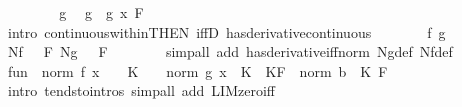\begin{isabellebody}
\ \ \isamarkupfalse%
\isanewline
\ \ \ \ \isamarkupfalse%
\ g\ \isamarkupfalse%
\ {\isachardoublequoteopen}{\isacharparenleft}{\kern0pt}g\ {\isasymlonglongrightarrow}\ g\ x{\isacharparenright}{\kern0pt}\ {\isacharquery}{\kern0pt}F{\isachardoublequoteclose}\isanewline
\ \ \ \ \ \ \isamarkupfalse%
\ {\isacharparenleft}{\kern0pt}intro\ continuous{\isacharunderscore}{\kern0pt}within{\isacharbrackleft}{\kern0pt}THEN\ iffD{}{\isacharbrackright}{\kern0pt}\ has{\isacharunderscore}{\kern0pt}derivative{\isacharunderscore}{\kern0pt}continuous{\isacharparenright}{\kern0pt}\isanewline
\ \ \ \ \isamarkupfalse%
\ \isamarkupfalse%
\ f\ g\ \isamarkupfalse%
\ {\isachardoublequoteopen}{\isacharparenleft}{\kern0pt}Nf\ {\isasymlonglongrightarrow}\ {}{\isacharparenright}{\kern0pt}\ {\isacharquery}{\kern0pt}F{\isachardoublequoteclose}\ {\isachardoublequoteopen}{\isacharparenleft}{\kern0pt}Ng\ {\isasymlonglongrightarrow}\ {}{\isacharparenright}{\kern0pt}\ {\isacharquery}{\kern0pt}F{\isachardoublequoteclose}\isanewline
\ \ \ \ \ \ \isamarkupfalse%
\ {\isacharparenleft}{\kern0pt}simp{\isacharunderscore}{\kern0pt}all\ add{\isacharcolon}{\kern0pt}\ has{\isacharunderscore}{\kern0pt}derivative{\isacharunderscore}{\kern0pt}iff{\isacharunderscore}{\kern0pt}norm\ Ng{\isacharunderscore}{\kern0pt}def\ Nf{\isacharunderscore}{\kern0pt}def{\isacharparenright}{\kern0pt}\isanewline
\ \ \ \ \isamarkupfalse%
\ \isamarkupfalse%
\ {\isachardoublequoteopen}{\isacharparenleft}{\kern0pt}{\isacharquery}{\kern0pt}fun{}\ {\isasymlonglongrightarrow}\ norm\ {\isacharparenleft}{\kern0pt}f\ x{\isacharparenright}{\kern0pt}\ {\isacharasterisk}{\kern0pt}\ {}\ {\isacharasterisk}{\kern0pt}\ K\ {\isacharplus}{\kern0pt}\ {}\ {\isacharasterisk}{\kern0pt}\ norm\ {\isacharparenleft}{\kern0pt}g\ x{\isacharparenright}{\kern0pt}\ {\isacharasterisk}{\kern0pt}\ K\ {\isacharplus}{\kern0pt}\ KF\ {\isacharasterisk}{\kern0pt}\ norm\ {\isacharparenleft}{\kern0pt}{}{\isacharcolon}{\kern0pt}{\isacharcolon}{\kern0pt}{\isacharprime}{\kern0pt}b{\isacharparenright}{\kern0pt}\ {\isacharasterisk}{\kern0pt}\ K{\isacharparenright}{\kern0pt}\ {\isacharquery}{\kern0pt}F{\isachardoublequoteclose}\isanewline
\ \ \ \ \ \ \isamarkupfalse%
\ {\isacharparenleft}{\kern0pt}intro\ tendsto{\isacharunderscore}{\kern0pt}intros{\isacharparenright}{\kern0pt}\ {\isacharparenleft}{\kern0pt}simp{\isacharunderscore}{\kern0pt}all\ add{\isacharcolon}{\kern0pt}\ LIM{\isacharunderscore}{\kern0pt}zero{\isacharunderscore}{\kern0pt}iff{\isacharparenright}{\kern0pt}\isanewline

\end{isabellebody}

